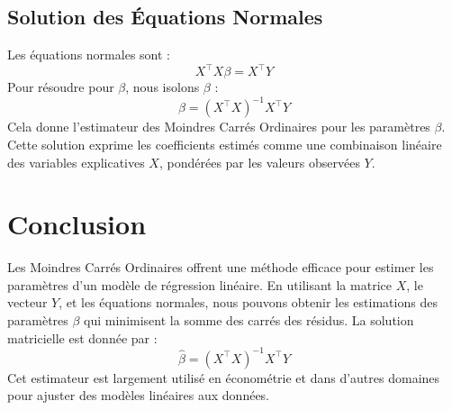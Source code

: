 \documentclass[14pt]{extarticle} %
\begin{document}
\subsection{Solution des Équations Normales}
Les équations normales sont :
\[
X^\top X\beta = X^\top Y
\]
Pour résoudre pour \(\beta\), nous isolons \(\beta\) :
\[
\beta = (X^\top X)^{-1} X^\top Y
\]
Cela donne l'estimateur des Moindres Carrés Ordinaires pour les paramètres \(\beta\). Cette solution exprime les coefficients estimés comme une combinaison linéaire des variables explicatives \(X\), pondérées par les valeurs observées \(Y\).

\section{Conclusion}
Les Moindres Carrés Ordinaires offrent une méthode efficace pour estimer les paramètres d'un modèle de régression linéaire. En utilisant la matrice \(X\), le vecteur \(Y\), et les équations normales, nous pouvons obtenir les estimations des paramètres \(\beta\) qui minimisent la somme des carrés des résidus. La solution matricielle est donnée par :
\[
\hat{\beta} = (X^\top X)^{-1} X^\top Y
\]
Cet estimateur est largement utilisé en économétrie et dans d'autres domaines pour ajuster des modèles linéaires aux données.
\end{document}
